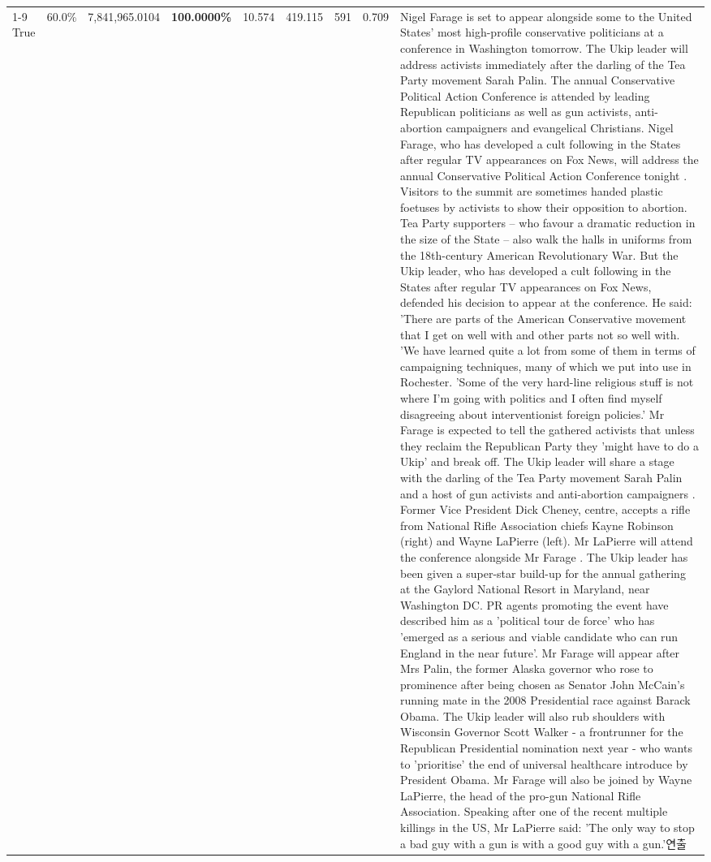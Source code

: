 \begin{table}[H]
\begin{tabular}{lllrlllll}
\cline{1-9}
True & 60.0\% & 7,841,965.0104 & \bfseries \color{red} 100.0000\% & 10.574 & 419.115 & 591 & 0.709 & Nigel Farage is set to appear alongside some to the United States' most high-profile conservative politicians at a conference in Washington tomorrow. The Ukip leader will address activists immediately after the darling of the Tea Party movement Sarah Palin. The annual Conservative Political Action Conference is attended by leading Republican politicians as well as gun activists, anti-abortion campaigners and evangelical Christians. Nigel Farage, who has developed a cult following in the States after regular TV appearances on Fox News, will address the annual Conservative Political Action Conference tonight . Visitors to the summit are sometimes handed plastic foetuses by activists to show their opposition to abortion. Tea Party supporters – who favour a dramatic reduction in the size of the State – also walk the halls in uniforms from the 18th-century American Revolutionary War. But the Ukip leader, who has developed a cult following in the States after regular TV appearances on Fox News, defended his decision to appear at the conference. He said: 'There are parts of the American Conservative movement that I get on well with and other parts not so well with. 'We have learned quite a lot from some of them in terms of campaigning techniques, many of which we put into use in Rochester. 'Some of the very hard-line religious stuff is not where I'm going with politics and I often find myself disagreeing about interventionist foreign policies.' Mr Farage is expected to tell the gathered activists that unless they reclaim the Republican Party they 'might have to do a Ukip' and break off. The Ukip leader will share a stage with the darling of the Tea Party movement Sarah Palin and a host of gun activists and anti-abortion campaigners . Former Vice President Dick Cheney, centre, accepts a rifle from National Rifle Association chiefs Kayne Robinson (right) and Wayne LaPierre (left). Mr LaPierre will attend the conference alongside Mr Farage . The Ukip leader has been given a super-star build-up for the annual gathering at the Gaylord National Resort in Maryland, near Washington DC. PR agents promoting the event have described him as a 'political tour de force' who has 'emerged as a serious and viable candidate who can run England in the near future'. Mr Farage will appear after Mrs Palin, the former Alaska governor who rose to prominence after being chosen as Senator John McCain's running mate in the 2008 Presidential race against Barack Obama. The Ukip leader will also rub shoulders with Wisconsin Governor Scott Walker - a frontrunner for the Republican Presidential nomination next year - who wants to 'prioritise' the end of universal healthcare introduce by President Obama. Mr Farage will also be joined by Wayne LaPierre, the head of the pro-gun National Rifle Association. Speaking after one of the recent multiple killings in the US, Mr LaPierre said: 'The only way to stop a bad guy with a gun is with a good guy with a gun.'연출 \\

\end{tabular}
\end{table}
